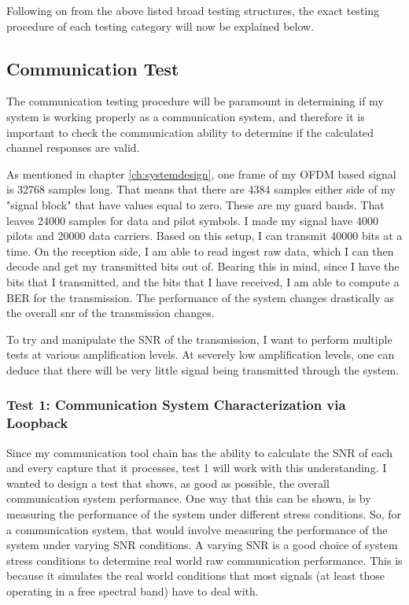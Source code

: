 \documentclass[class=report,11pt,crop=false]{standalone}
\begin{document}
Following on from the above listed broad testing structures, the exact testing procedure of each testing category will now be explained below.

\subsection{Communication Test}
The communication testing procedure will be paramount in determining if my system is working properly as a communication system, and therefore it is important to check the communication ability to determine if the calculated channel responses are valid.

As mentioned in chapter \ref{ch:systemdesign}, one frame of my OFDM based signal is 32768 samples long. That means that there are 4384 samples either side of my "signal block" that have values equal to zero. These are my guard bands. That leaves 24000 samples for data and pilot symbols. I made my signal have 4000 pilots and 20000 data carriers. Based on this setup, I can transmit 40000 bits at a time. On the reception side, I am able to read ingest raw data, which I can then decode and get my transmitted bits out of. Bearing this in mind, since I have the bits that I transmitted, and the bits that I have received, I am able to compute a BER for the transmission. The performance of the system changes drastically as the overall \gls{snr} of the transmission changes.

To try and manipulate the SNR of the transmission, I want to perform multiple tests at various amplification levels. At severely low amplification levels, one can deduce that there will be very little signal being transmitted through the system.

\subsubsection{Test 1: Communication System Characterization via Loopback}
Since my communication tool chain has the ability to calculate the SNR of each and every capture that it processes, test 1 will work with this understanding. I wanted to design a test that shows, as good as possible, the overall communication system performance. One way that this can be shown, is by measuring the performance of the system under different stress conditions. So, for a communication system, that would involve measuring the performance of the system under varying SNR conditions. A varying SNR is a good choice of system stress conditions to determine real world raw communication performance. This is because it simulates the real world conditions that most signals (at least those operating in a free spectral band) have to deal with.
\end{document}
